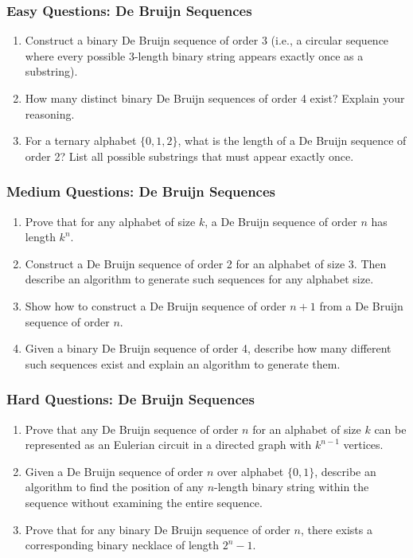 \documentclass{article}
\theoremstyle{definition}
\begin{document}
\subsubsection{Easy Questions: De Bruijn Sequences}
\begin{enumerate}[resume]
    \item Construct a binary De Bruijn sequence of order 3 (i.e., a circular sequence where every possible 3-length binary string appears exactly once as a substring).
    
    \item How many distinct binary De Bruijn sequences of order 4 exist? Explain your reasoning.
    
    \item For a ternary alphabet $\{0,1,2\}$, what is the length of a De Bruijn sequence of order 2? List all possible substrings that must appear exactly once.
    
    
\end{enumerate}

\subsubsection{Medium Questions: De Bruijn Sequences}
\begin{enumerate}[resume]
    \item Prove that for any alphabet of size $k$, a De Bruijn sequence of order $n$ has length $k^n$.
    
    \item Construct a De Bruijn sequence of order 2 for an alphabet of size 3. Then describe an algorithm to generate such sequences for any alphabet size.
    
    \item Show how to construct a De Bruijn sequence of order $n+1$ from a De Bruijn sequence of order $n$.
    
    \item Given a binary De Bruijn sequence of order 4, describe how many different such sequences exist and explain an algorithm to generate them.
\end{enumerate}

\subsubsection{Hard Questions: De Bruijn Sequences}
\begin{enumerate}[resume]
    \item Prove that any De Bruijn sequence of order $n$ for an alphabet of size $k$ can be represented as an Eulerian circuit in a directed graph with $k^{n-1}$ vertices.
    
    \item Given a De Bruijn sequence of order $n$ over alphabet $\{0,1\}$, describe an algorithm to find the position of any $n$-length binary string within the sequence without examining the entire sequence.
    
    \item Prove that for any binary De Bruijn sequence of order $n$, there exists a corresponding binary necklace of length $2^n - 1$.
\end{enumerate}
\end{document}
